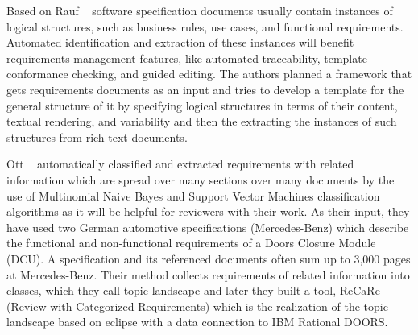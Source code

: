 Based on Rauf \etal~\cite{Rauf:2011} software specification documents usually
contain instances of logical structures, such as business rules, use cases, and
functional requirements. Automated identification and extraction of these
instances will benefit requirements management features, like automated
traceability, template conformance checking, and guided editing. The authors
planned a framework that gets requirements documents as an input and tries to
develop a template for the general structure of it by specifying logical
structures in terms of their content, textual rendering, and variability and
then the extracting the instances of such structures from rich-text documents.

Ott \etal~\cite{Ott:2013} automatically classified and extracted requirements
with related information which are spread over many sections over many documents
by the use of Multinomial Naive Bayes and Support Vector Machines classification
algorithms as it will be helpful for reviewers with their work. As their input,
they have used two German automotive specifications (Mercedes-Benz) which
describe the functional and non-functional requirements of a Doors Closure
Module (DCU). A specification and its referenced documents often sum up to 3,000
pages at Mercedes-Benz. Their method collects requirements of related
information into classes, which they call topic landscape and later they built a
tool, ReCaRe (Review with Categorized Requirements) which is the realization of
the topic landscape based on eclipse with a data connection to IBM Rational
DOORS.





